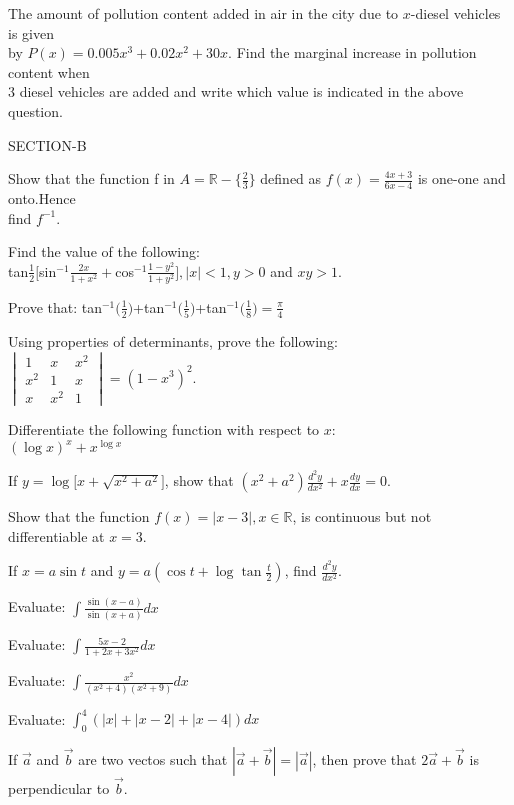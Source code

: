 \documentclass[14pt]{exam}
\begin{document}
\begin{questions}
        \question The amount of pollution content added in air in the city due to $x$-diesel vehicles is given\\ by $P(x)=0.005x^3+0.02x^2+30x$. Find the marginal increase in pollution content when\\ 3 diesel vehicles are added and write which value is indicated in the above question.\\

	\centerline{SECTION-B}

	\question Show that the function f in $A=\mathbb{R}-\bigl\{\frac{2}{3}\bigl\}$ defined as $f(x)=\frac{4x+3}{6x-4}$ is one-one and onto.Hence\\ find $f^{-1}$.

	\question Find the value of the following:\\ tan$\frac{1}{2}\biggl[$sin$^{-1}\frac{2x}{1+x^{2}}+$cos$^{-1}\frac{1-y^2}{1+y^2}\biggl], |x|<1,y>0$ and $xy>1$.

	\question Prove that: tan$^{-1}\bigl(\frac{1}{2}\bigl)$+tan$^{-1}\bigl(\frac{1}{5}\bigl)$+tan$^{-1}\bigl(\frac{1}{8}\bigl)=\frac{\pi}{4}$

	\question Using properties of determinants, prove the following:\\ $\begin{vmatrix}
		1 & x & x^2\\
		x^2 & 1 & x\\
		x & x^2 & 1
	        \end{vmatrix}
		=(1-x^3)^2.$

	\question Differentiate the following function with respect to $x$:\\
	$(\log x)^x+x^{\log x}$

	\question If $y=\log\biggl[ x+\sqrt{x^2+a^2} \biggl]$, show that $(x^2+a^2)\frac{d^2y}{dx^2}+x\frac{dy}{dx}=0.$

	\question Show that the function $f(x)=|x-3|, x\in\mathbb{R}$, is continuous but not differentiable at $x=3$.

	\question If $x=a \sin t$ and $y=a(\cos t+\log \tan\frac{t}{2})$, find $\frac{d^2y}{dx^2}.$

	\question Evaluate: $\int \frac{\sin(x-a)}{\sin(x+a)} dx$

	\question Evaluate: $\int \frac{5x-2}{1+2x+3x^2} dx$

	\question Evaluate: $\int \frac{x^2}{(x^2+4)(x^2+9)} dx$

	\question Evaluate: $\int_0^4 (|x|+|x-2|+|x-4|) dx$

	\question If $\vec{a}$ and $\vec{b}$ are two vectos such that $|\vec{a}+\vec{b}|=|\vec{a}|$, then prove that $2\vec{a}+\vec{b}$ is\\ perpendicular to $\vec{b}$.


\end{questions}
\end{document}
